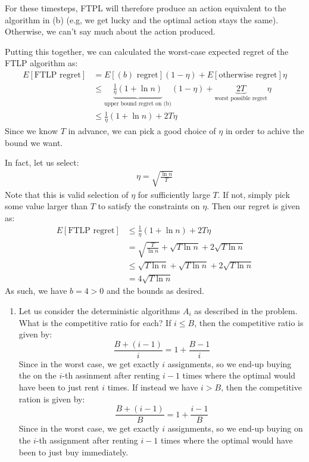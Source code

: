 \documentclass[12pt]{exam}
\newcommand{\Q}[1]{\question{\large{\textbf{#1}}}}
\begin{document}
\begin{questions}
\begin{solution}
\begin{enumerate}[label=(\alph*)]
      For these timesteps, FTPL will therefore produce an action equivalent to the algorithm in (b) (e.g, we get lucky and the optimal action stays the same). Otherwise, we can't say much about the action produced.

      Putting this together, we can calculated the worst-case expected regret of the FTLP algorithm as:
      \begin{align*}
        E[\text{FTLP regret}] &= E[(b)\text{ regret}](1 - \eta) + E[\text{otherwise regret}]\eta \\
        &\leq \underbrace{\frac{1}{\eta}\left(1 + \ln n \right)}_{\text{upper bound regret on (b)}}(1-\eta) + \underbrace{2 T}_{\text{worst possible regret}} \eta \\
        &\leq \frac{1}{\eta}(1 + \ln n) + 2T\eta \tag{Simple upperbound}
      \end{align*}
      Since we know $T$ in advance, we can pick a good choice of $\eta$ in order to achive the bound we want.

      In fact, let us select:
      \begin{align*}
        \eta = \sqrt{\frac{\ln n}{T}}
      \end{align*}
      Note that this is valid selection of $\eta$ for sufficiently large $T$. If not, simply pick some value larger than $T$ to satisfy the constraints on $\eta$. Then our regret is given as:
      \begin{align*}
         E[\text{FTLP regret}] &\leq \frac{1}{\eta}(1 + \ln n) + 2T\eta \\
         &= \sqrt{\frac{T}{\ln n}} + \sqrt{T\ln n} + 2\sqrt{T \ln n} \\
         &\leq \sqrt{T \ln n} + \sqrt{T \ln n} + 2\sqrt{T \ln n} \\
         &= 4\sqrt{T \ln n}
      \end{align*}
      As such, we have $b = 4 > 0$ and the bounds as desired.
  \end{enumerate}
\end{solution}

\newpage
\Q{Problem 15}
\begin{solution}
  \begin{enumerate}[label=(\alph*)]
    \item Let us consider the deterministic algorithms $A_i$ as described in the problem. What is the competitive ratio for each? If $i \leq B$, then the competitive ratio is given by:
    \[
      \frac{B + (i-1)}{i} = 1 + \frac{B-1}{i}
    \]
    Since in the worst case, we get exactly $i$ assignments, so we end-up buying the on the $i$-th assinment after renting $i - 1$ times where the optimal would have been to just rent $i$ times. If instead we have $i > B$, then the competitive ration is given by:
    \[
      \frac{B + (i-1)}{B} = 1 + \frac{i-1}{B}
    \]
    Since in the worst case, we get exactly $i$ assignments, so we end-up buying on the $i$-th assignment after renting $i - 1$ times where the optimal would have been to just buy immediately.


\end{enumerate}
\end{solution}
\end{questions}
\end{document}
